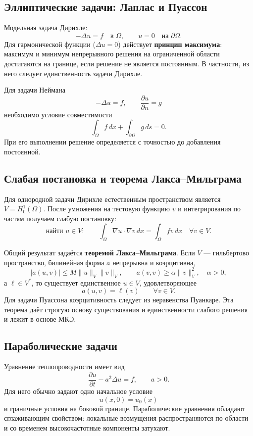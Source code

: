 \subsection{Эллиптические задачи: Лаплас и Пуассон}

Модельная задача Дирихле:
\[
-\Delta u=f\quad\text{в }\Omega,
\qquad
u=0\quad\text{на }\partial\Omega.
\]
Для гармонической функции ($\Delta u=0$) действует \textbf{принцип
максимума}: максимум и минимум непрерывного решения на ограниченной
области достигаются на границе, если решение не является постоянным.
В частности, из него следует единственность задачи Дирихле.

Для задачи Неймана
\[
-\Delta u=f,
\qquad
\frac{\partial u}{\partial n}=g
\]
необходимо условие совместимости
\[
\boxed{
\int_\Omega f\,dx+\int_{\partial\Omega}g\,ds=0.
}
\]
При его выполнении решение определяется с точностью до добавления
постоянной.

\subsection{Слабая постановка и теорема Лакса--Мильграма}

Для однородной задачи Дирихле естественным пространством является
$V=H_0^1(\Omega)$. После умножения на тестовую функцию $v$ и интегрирования
по частям получаем слабую постановку:
\[
\boxed{
\text{найти }u\in V:\qquad
\int_\Omega \nabla u\cdot\nabla v\,dx
=\int_\Omega fv\,dx
\quad\forall v\in V.
}
\]

Общий результат задаётся \textbf{теоремой Лакса--Мильграма}. Если $V$ ---
гильбертово пространство, билинейная форма $a$ непрерывна и коэрцитивна,
\[
|a(u,v)|\le M\|u\|_V\|v\|_V,
\qquad
a(v,v)\ge\alpha\|v\|_V^2,
\quad \alpha>0,
\]
а $\ell\in V^*$, то существует единственное $u\in V$, удовлетворяющее
\[
a(u,v)=\ell(v)\qquad\forall v\in V.
\]
Для задачи Пуассона коэрцитивность следует из неравенства Пуанкаре.
Эта теорема даёт строгую основу существования и единственности слабого
решения и лежит в основе МКЭ.

\subsection{Параболические задачи}

Уравнение теплопроводности имеет вид
\[
\frac{\partial u}{\partial t}-a^2\Delta u=f,
\qquad a>0.
\]
Для него обычно задают одно начальное условие
\[
u(x,0)=u_0(x)
\]
и граничные условия на боковой границе. Параболические уравнения обладают
сглаживающим свойством: локальные возмущения распространяются по области и
со временем высокочастотные компоненты затухают.

